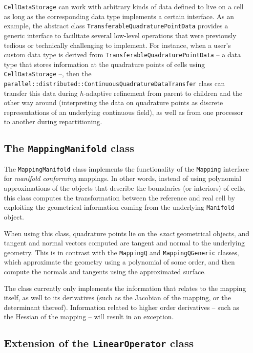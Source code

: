 \documentclass{ansarticle-preprint}
\begin{document}
\texttt{CellDataStorage} can work with arbitrary kinds of data defined
to live on a cell as long as the corresponding data type implements a
certain interface. As an example,
the abstract class \texttt{TransferableQuadraturePointData} provides
a generic interface to facilitate several low-level operations
that were previously tedious or technically challenging to implement.
For instance, when a user's custom data type is derived from \texttt{TransferableQuadraturePointData}
-- a data type that stores information at the quadrature points of cells using
\texttt{CellDataStorage} --,
then the \texttt{parallel::distributed::ContinuousQuadratureDataTransfer} class
can transfer this data during
$h$-adaptive refinement from parent to children and the other way around
(interpreting the data on quadrature points as discrete representations of an
underlying continuous field),
as well as from one processor to another during repartitioning.

\subsection{The \texttt{MappingManifold} class}

The \texttt{MappingManifold} class implements the functionality
of the \texttt{Mapping} interface for \emph{manifold conforming}
mappings. In other words, instead of using polynomial approximations
of the objects that describe the boundaries (or interiors) of cells,
this class computes the transformation between the
reference and real cell by exploiting the geometrical information
coming from the underlying \texttt{Manifold} object.

When using this class,
quadrature points lie on the \textit{exact}
geometrical objects, and tangent and normal vectors computed
are tangent and normal to the underlying geometry. This is
in contrast with the \texttt{MappingQ} and \texttt{MappingQGeneric}
classes, which approximate the geometry using a polynomial of some
order, and then compute the normals and tangents using the
approximated surface.

The class currently only implements the information that relates to
the mapping itself, as well to its derivatives (such as the Jacobian
of the mapping, or the determinant thereof). Information related to
higher order derivatives -- such as the Hessian of the mapping -- will
result in an exception.


\subsection{Extension of the \texttt{LinearOperator} class}
\end{document}
